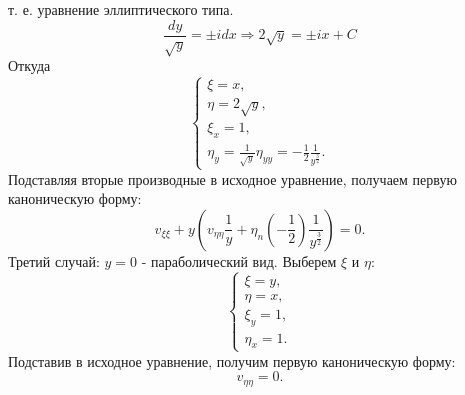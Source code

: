\documentclass[11pt]{article}
\begin{document}
т. е. уравнение эллиптического типа.
\begin{equation*}
\frac{dy}{\sqrt{y}} = \pm idx \Rightarrow 2\sqrt{y} = \pm ix + C
\end{equation*}
Откуда
\begin{equation*}
\begin{cases}
\xi = x, \\
\eta = 2\sqrt{y}, \\
\xi_x = 1, \\
\eta_y = \frac1{\sqrt{y}}
\eta_{yy} = -\frac12\frac1{y^{\frac32}}.
\end{cases}
\end{equation*}
Подставляя вторые производные в исходное уравнение, получаем первую каноническую форму:
\begin{equation}
v_{\xi\xi} + y\left(v_{\eta\eta}\frac1y + \eta_n\left(-\frac12\right)\frac1{y^{\frac32}}\right) = 0.
\end{equation}
Третий случай: \(y = 0\) - параболический вид. Выберем \(\xi\) и \(\eta\):
\begin{equation*}
\begin{cases}
\xi = y, \\
\eta = x, \\
\xi_y = 1, \\
\eta_x = 1.
\end{cases}
\end{equation*}
Подставив в исходное уравнение, получим первую каноническую форму:
\begin{equation}
v_{\eta\eta} = 0.
\end{equation}
\end{document}
